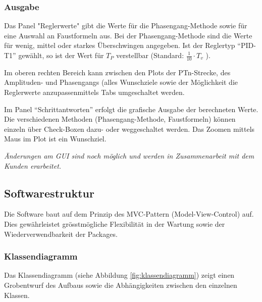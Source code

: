 \subsubsection*{Ausgabe}
Das Panel "Reglerwerte" gibt die  Werte f\"ur die Phasengang-Methode sowie f\"ur
eine Auswahl  an Faustformeln aus. Bei  der Phasengang-Methode sind  die Werte
f\"ur wenig, mittel oder  starkes \"Uberschwingen angegeben. Ist der Reglertyp
``PID-T1''  gew\"ahlt, so  ist  der Wert  f\"ur  $T_P$ verstellbar  (Standard:
$\frac{1}{10} \cdot T_v$ ).

Im    oberen    rechten    Bereich     kann    zwischen    den    Plots    der
PTn-Strecke,    des    Amplituden-    und Phasengangs (alles Wunschziele
sowie   der    M\"oglichkeit   die   Reglerwerte
anzupassen\footnotemark[2] mittels Tabs umgeschaltet werden.

Im Panel  ``Schrittantworten'' erfolgt die grafische  Ausgabe der berechneten
Werte. Die verschiedenen Methoden  (Phasengang-Methode, Faustformeln) k\"onnen
einzeln \"uber Check-Boxen dazu- oder weggeschaltet werden. Das Zoomen mittels
Maus im Plot ist ein Wunschziel.




{\em{\"Anderungen am GUI  sind noch m\"oglich und werden  in Zusammenarbeit mit dem Kunden erarbeitet.}}


\subsection{Softwarestruktur}
Die  Software  baut  auf  dem  Prinzip  des  MVC-Pattern  (Model-View-Control)
auf. Dies  gew\"ahrleistet gr\"osstm\"ogliche  Flexibilit\"at  in der  Wartung
sowie der Wiederverwendbarkeit der Packages.


\subsubsection*{Klassendiagramm}
Das  Klassendiagramm (siehe  Abbildung \ref{fig:klassendiagramm})  zeigt einen
Grobentwurf  des Aufbaus  sowie  die Abh\"angigkeiten  zwischen den  einzelnen
Klassen.



